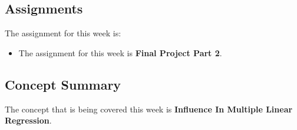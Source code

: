 \subsection{Assignments}

The assignment for this week is:

\begin{itemize}
    \item The assignment for this week is \textbf{Final Project Part 2}. 
\end{itemize}

\subsection{Concept Summary}

The concept that is being covered this week is \textbf{Influence In Multiple Linear Regression}.

